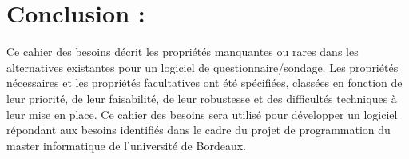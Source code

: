 \documentclass{article}
\begin{document}
\section{Conclusion :}

Ce cahier des besoins décrit les propriétés manquantes ou rares dans les alternatives existantes pour un logiciel de questionnaire/sondage. Les propriétés nécessaires et les propriétés facultatives ont été spécifiées, classées en fonction de leur priorité, de leur faisabilité, de leur robustesse et des difficultés techniques à leur mise en place. Ce cahier des besoins sera utilisé pour développer un logiciel répondant aux besoins identifiés dans le cadre du projet de programmation du master informatique de l'université de Bordeaux.
\end{document}
